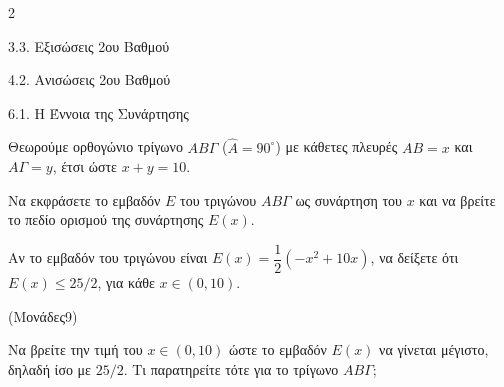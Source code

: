 \begin{ylh}{2}
    \item 3.3. Εξισώσεις 2ου Βαθμού
    \item 4.2. Ανισώσεις 2ου Βαθμού
    \item 6.1. Η Έννοια της Συνάρτησης
\end{ylh}
Θεωρούμε ορθογώνιο τρίγωνο $AB\Gamma$ ($\hat{A} = 90^\circ$) με κάθετες πλευρές $AB = x$ και $A\Gamma = y$, έτσι ώστε $x + y = 10$.

\begin{alist}
\item Να εκφράσετε το εμβαδόν $E$ του τριγώνου $AB\Gamma$ ως συνάρτηση του $x$ και να βρείτε το πεδίο ορισμού της συνάρτησης $E(x)$.
\item Αν το εμβαδόν του τριγώνου είναι $E(x) = \dfrac{1}{2}(-x^2 + 10x)$, να δείξετε ότι $E(x) \le 25/2$, για κάθε $x \in (0, 10)$.

(Μονάδες9)

\item Να βρείτε την τιμή του $x \in (0, 10)$ ώστε το εμβαδόν $E(x)$ να γίνεται μέγιστο, δηλαδή ίσο με $25/2$. Τι παρατηρείτε τότε για το τρίγωνο $AB\Gamma$;
\end{alist}

